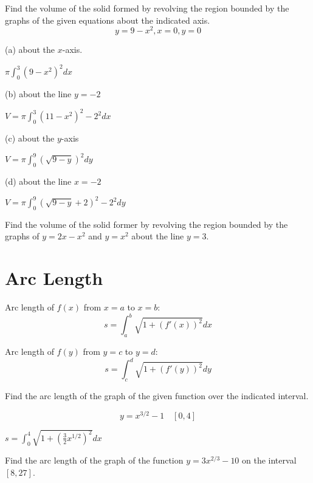 \documentclass[../bccalc.tex]{subfiles}
\begin{document}
\begin{example}
    Find the volume of the solid formed by revolving the region bounded by the graphs of the given equations about the indicated axis.
    \[ y=9-x^2, x=0, y=0 \]

    (a) about the $x$-axis.

    $\pi \int_0^3 (9-x^2)^2 dx$

    (b) about the line $y=-2$

    $V=\pi \int_0^3 (11-x^2)^2 - 2^2 dx$

    (c) about the $y$-axis 

    $V=\pi \int_0^9 (\sqrt{9-y})^2 dy$

    (d) about the line $x=-2$

    $V=\pi \int_0^9 (\sqrt{9-y}+2)^2-2^2 dy$
\end{example}

\ex Find the volume of the solid former by revolving the region bounded by the graphs of $y=2x-x^2$ and $y=x^2$ about the line $y=3$.

\section{Arc Length}
Arc length of $f(x)$ from $x=a$ to $x=b$:
\[ s=\int_a^b \sqrt{1+(f'(x))^2}dx \]

Arc length of $f(y)$ from $y=c$ to $y=d$:
\[ s=\int_c^d \sqrt{1+(f'(y))^2}dy \]

\begin{example}
    Find the arc length of the graph of the given function over the indicated interval.

    \[ y=x^{3/2}-1 \quad [0,4] \]

    $s=\int_0^4 \sqrt{1+\left(\frac{3}{2}x^{1/2}\right)^2}dx$
\end{example}

\ex Find the arc length of the graph of the function $y=3x^{2/3}-10$ on the interval $[8,27]$.
\end{document}
